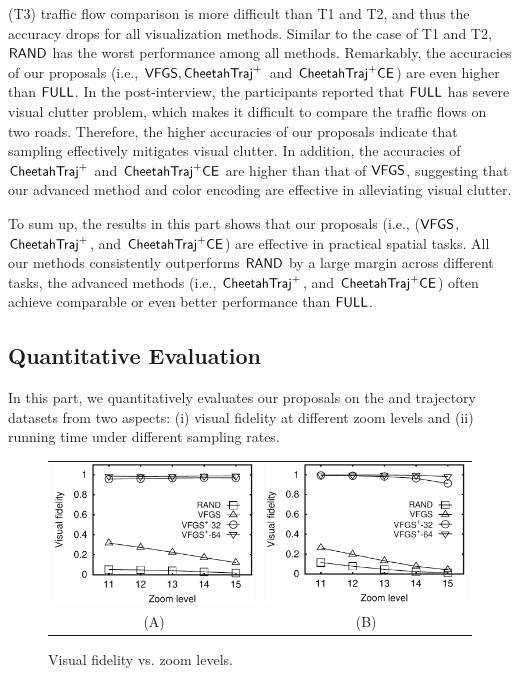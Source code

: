 (T3) traffic flow comparison is more difficult than T1 and T2, and thus the accuracy drops for all visualization methods. Similar to the case of T1 and T2, $\mathsf{RAND}$ has the worst performance among all methods. Remarkably, the accuracies of our proposals (i.e.,  $\mathsf{VFGS},\mathsf{CheetahTraj}^{+}$ and $\mathsf{CheetahTraj}^{+}\mathsf{CE}$) are even higher than $\mathsf{FULL}$. In the post-interview, the participants reported that $\mathsf{FULL}$ has severe visual clutter problem, which makes it difficult to compare the traffic flows on two roads. Therefore, the higher accuracies of our proposals indicate that sampling effectively mitigates visual clutter. In addition, the accuracies of $\mathsf{CheetahTraj}^{+}$ and $\mathsf{CheetahTraj}^{+}\mathsf{CE}$ are higher than that of $\mathsf{VFGS}$, suggesting that our advanced method and color encoding are effective in alleviating visual clutter.

To sum up, the results in this part shows that our proposals (i.e., ($\mathsf{VFGS}$, $\mathsf{CheetahTraj}^{+}$, and $\mathsf{CheetahTraj}^{+}\mathsf{CE}$) are effective in practical spatial tasks. All our methods consistently outperforms $\mathsf{RAND}$ by a large margin across different tasks, the advanced methods (i.e., $\mathsf{CheetahTraj}^{+}$, and $\mathsf{CheetahTraj}^{+}\mathsf{CE}$) often achieve comparable or even better performance than  $\mathsf{FULL}$.

\subsection{Quantitative Evaluation}\label{sec:quality}
In this part, we quantitatively evaluates our proposals on the \pt{} and \sz{} trajectory datasets from two aspects:
(i) visual fidelity at different zoom levels
and (ii) running time under different sampling rates.

\begin{figure}
 \centering
 \small
 \begin{tabular}{cc}
   \includegraphics[width=0.44\columnwidth]{pictures/fporto}
   &
   \includegraphics[width=0.44\columnwidth]{pictures/fshenzhen}
   \\
   (A) \pt{}
   &
   (B) \sz{}
 \end{tabular}
 \vspace{-3mm}
 \caption{Visual fidelity vs. zoom levels.}
 \label{fig:fidelity}
 \vspace{-6mm}
\end{figure}

